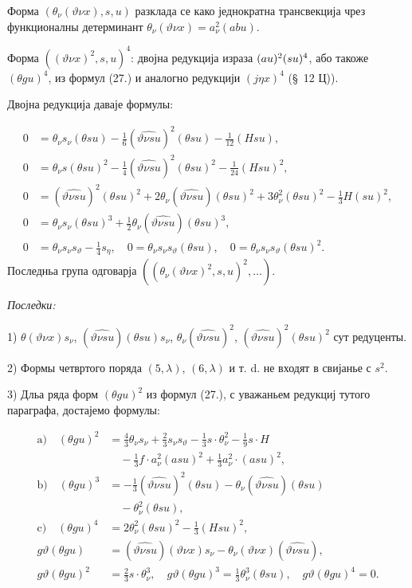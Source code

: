 ﻿\documentclass[11pt]{article}
\let\A\relax
\newcommand{\A}{\mathfrak A}
\begin{document}
Форма $(\theta_{\nu}(\vartheta\nu x),s,u)$ разклада се како једнократна трансвекција чрез функционалны детерминант $\theta_{\nu}(\vartheta\nu x)=a_{\nu}^2(abu)$.

Форма $((\vartheta\nu x)^2,s,u)^4$: двојна редукција израза $(a\A u)^2(\A su)^4$, або такоже $(\theta gu)^4$, из формул (27.) и аналогно редукцији $(j\eta x)^4$ (\S\ 12 Ц)).

Двојна редукција даваје формулы:

\[
\tag{28}
\begin{aligned}
0&=\theta_{\nu}s_{\nu}(\theta su)-\frac16(\widehat{\vartheta\nu su})^2(\theta su)-\frac1{12}(Hsu),\\
0&=\theta_{\nu} s(\theta su)^2-\frac14(\widehat{\vartheta\nu su})^2(\theta su)^2-\frac1{24}(Hsu)^2,\\
0&=(\widehat{\vartheta\nu su})^2(\theta su)^2+2\theta_{\nu}(\widehat{\vartheta\nu su})(\theta su)^2
  +3\theta_{\nu}^2(\theta su)^2-\frac13H(su)^2,\\
0&=\theta_{\nu}s_{\nu}(\theta su)^3+\frac12\theta_{\nu}(\widehat{\vartheta\nu su})(\theta su)^3,\\
0&=\theta_{\nu}s_{\nu}s_\vartheta-\frac14s_\eta,
\quad 0=\theta_{\nu}s_{\nu}s_\vartheta(\theta su),
\quad 0=\theta_{\nu}s_{\nu}s_\vartheta(\theta su)^2.
\end{aligned}
\]
Последньа група одговарја $((\theta_{\nu}(\vartheta\nu x)^2,s,u)^2,\ldots)$.

\noindent\textit{Последки:}

1) $\theta(\vartheta\nu x)s_{\nu}$, $(\widehat{\vartheta\nu su})(\theta su)s_{\nu}$, $\theta_{\nu}(\widehat{\vartheta\nu su})^2$, $(\widehat{\vartheta\nu su})^2(\theta su)^2$ сут редуценты.

2) Формы четвртого поряда $(5,\lambda)$, $(6,\lambda)$ и т. d. не входят в свијанье с $s^2$.

3) Дльа ряда форм $(\theta gu)^2$ из формул (27.), с уважаньем редукциј тутого параграфа, достајемо формулы:

\[
\tag{29}
\begin{aligned}
\mathrm{a)}\quad (\theta gu)^2&=\frac43\theta_{\nu}s_{\nu}+\frac23s_{\nu}s_\vartheta-\frac13s\cdot\theta_{\nu}^2-\frac19s\cdot H\\
&\quad-\frac13f\cdot a_{\nu}^2(asu)^2+\frac13a_{\nu}^2\cdot(asu)^2,\\
\mathrm{b)}\quad (\theta gu)^3&=-\frac13(\widehat{\vartheta\nu su})^2(\theta su)-\theta_{\nu}(\widehat{\vartheta\nu su})(\theta su)\\
&\quad-\theta_{\nu}^2(\theta su),\\
\mathrm{c)}\quad (\theta gu)^4&=2\theta_{\nu}^2(\theta su)^2-\frac13(Hsu)^2,\\
g\vartheta(\theta gu)&=(\widehat{\vartheta\nu su})(\vartheta\nu x)s_{\nu}-\theta_{\nu}(\vartheta\nu x)(\widehat{\vartheta\nu su}),\\
g\vartheta(\theta gu)^2&=\frac23s\cdot\theta_{\nu}^3,
\quad g\vartheta(\theta gu)^3=\frac13\theta_{\nu}^3(\theta su),
\quad g\vartheta(\theta gu)^4=0.
\end{aligned}
\]
\end{document}
